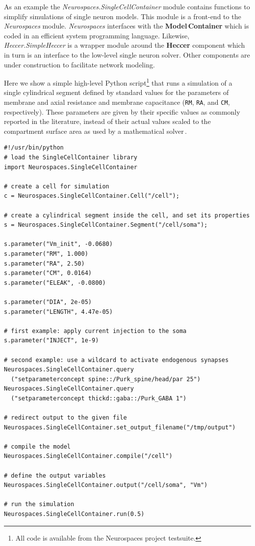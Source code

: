 \documentclass[12pt]{article}
\begin{document}
As an example the {\it Neurospaces.SingleCellContainer} module
contains functions to simplify simulations of single neuron models.
This module is a front-end to the {\it Neurospaces} module.  {\it
  Neurospaces} interfaces with the {\bf Model\,Container} which is coded in
an efficient system programming language.  Likewise, {\it
  Heccer.SimpleHeccer} is a wrapper module around the {\bf Heccer}
component which in turn is an interface to the low-level single neuron
solver.  Other components are under construction to facilitate network
modeling.

Here we show a simple high-level Python script\footnote{All code is
  available from the Neurospaces project testsuite.} that runs a
simulation of a single cylindrical segment defined by standard values
for the parameters of membrane and axial resistance and membrane
capacitance ({\tt RM}, {\tt RA},
and {\tt CM}, respectively).  These parameters are given by their
specific values as commonly reported in the literature, instead of
their actual values scaled to the compartment surface area as used by
a mathematical solver\,\cite{cornelis04:_neuros_param_handl}.

{\vspace*{1mm}
 { \footnotesize
  \linenumbers
  {\begin{verbatim}
#!/usr/bin/python
# load the SingleCellContainer library
import Neurospaces.SingleCellContainer

# create a cell for simulation
c = Neurospaces.SingleCellContainer.Cell("/cell");

# create a cylindrical segment inside the cell, and set its properties
s = Neurospaces.SingleCellContainer.Segment("/cell/soma");

s.parameter("Vm_init", -0.0680)
s.parameter("RM", 1.000)
s.parameter("RA", 2.50)
s.parameter("CM", 0.0164)
s.parameter("ELEAK", -0.0800)

s.parameter("DIA", 2e-05)
s.parameter("LENGTH", 4.47e-05)

# first example: apply current injection to the soma
s.parameter("INJECT", 1e-9)

# second example: use a wildcard to activate endogenous synapses
Neurospaces.SingleCellContainer.query
  ("setparameterconcept spine::/Purk_spine/head/par 25")
Neurospaces.SingleCellContainer.query
  ("setparameterconcept thickd::gaba::/Purk_GABA 1")

# redirect output to the given file
Neurospaces.SingleCellContainer.set_output_filename("/tmp/output")

# compile the model
Neurospaces.SingleCellContainer.compile("/cell")

# define the output variables
Neurospaces.SingleCellContainer.output("/cell/soma", "Vm")
    
# run the simulation
Neurospaces.SingleCellContainer.run(0.5)
\end{verbatim}
  \vspace*{1mm} }}}
\end{document}
